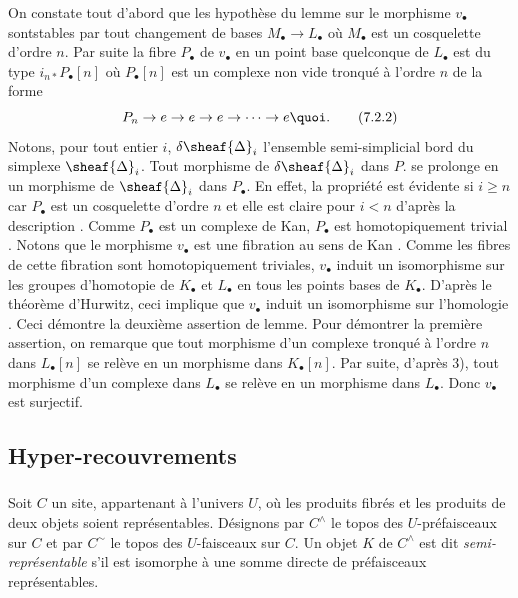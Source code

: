 On constate tout d'abord que les hypothèse du lemme sur le morphisme
$v_{∙}$ sont\pageoriginale stables par tout changement de bases $M_∙
\to L_∙$ où $M_∙$ est un cosquelette d'ordre $n$. Par suite la
fibre $P_{∙}$ de $v_{∙}$ en un point base quelconque de $L_∙$ est du type
$i_{n\ast} P_{∙} [n]$ où $P_{∙}[n]$ est un complexe non vide tronqué à
l'ordre $n$ de la forme
\begin{equation*}
P_n \to e \to e \to e \to \cdots \to e{\quoi}.\tag{7.2.2}
\end{equation*}
Notons, pour tout entier $i$, $\delta \sheaf{\Delta}_i$ l'ensemble
semi-simplicial bord du simplexe $\sheaf{\Delta}_{i}$. Tout morphisme
de $\delta\sheaf{\Delta}_{i}$ dans $P$. se prolonge en un morphisme
de $\sheaf{\Delta}_{i}$ dans $P_{∙}$. En effet, la propriété est
évidente si $i \geq n$ car $P_{∙}$ est un cosquelette d'ordre $n$ et
elle est claire pour $i < n$ d'après la description .
Comme $P_{∙}$ est un complexe de Kan, $P_{∙}$ est homotopiquement trivial
\cite{6}. Notons que le morphisme $v_{∙}$ est une fibration au sens de
Kan \cite{6}. Comme les fibres de cette fibration sont
homotopiquement triviales, $v_{∙}$ induit un isomorphisme sur les
groupes d'homotopie de $K_∙$ et $L_∙$ en tous les points bases de
$K_∙$. D'après le théorème d'Hurwitz, ceci implique que $v_{∙}$ induit
un isomorphisme sur l'homologie \cite{6}. Ceci démontre la deuxième
assertion de lemme. Pour démontrer la première assertion, on
remarque que tout morphisme d'un complexe tronqué à l'ordre $n$ dans
$L_∙[n]$ se relève en un morphisme dans $K_∙[n]$. Par suite, d'après
3), tout morphisme d'un complexe dans $L_∙$ se relève en un morphisme
dans $L_∙$. Donc $v_{∙}$ est surjectif.

\subsection{Hyper-recouvrements}

\setcounter{subsubsection}{-1}
\subsubsection{}
Soit $C$ un site, appartenant à l'univers $U$, où les produits
fibrés et les produits de deux objets soient
représentables. Désignons par $C^{\wedge}$
le topos des $U$-préfaisceaux sur $C$ et par $C^{\sim}$ le topos des
$U$-faisceaux sur $C$. Un objet $K$ de $C^{\wedge}$ est
dit \emph{semi-représentable} s'il est isomorphe à une somme directe
de préfaisceaux représentables.

